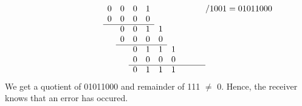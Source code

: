 \documentclass{csc_assignment}
\begin{document}
\begin{description}
\begin{enumerate}
\[\begin{array}[t]{*{16}{l}}
	&&&&&&&0&0&0&1&&&&&\\
	&&&&&&&0&0&0&0&&&&&\\\cline{8-11}
	&&&&&&&&0&0&1&1&&&&\\
	&&&&&&&&0&0&0&0&&&\\\cline{9-12}
	&&&&&&&&&0&1&1&1&&&\\
	&&&&&&&&&0&0&0&0\\\cline{10-16}
	&&&&&&&&&0&1&1&1&&&\\
\end{array}/1001=01011000
\]
We get a quotient of 01011000 and remainder of 111 $\neq$ 0. Hence, the receiver knows that an error has occured.
\end{enumerate}



\end{description}
\end{document}
